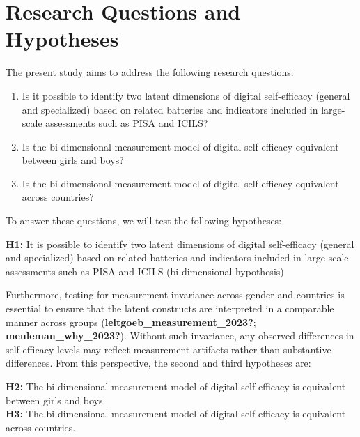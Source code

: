 \documentclass[
  letterpaper,
  DIV=11,
  numbers=noendperiod]{scrartcl}
\providecommand{\tightlist}{%
  \setlength{\itemsep}{0pt}\setlength{\parskip}{0pt}}\usepackage{longtable,booktabs,array}
\begin{document}
\section{Research Questions and
Hypotheses}\label{research-questions-and-hypotheses}

The present study aims to address the following research questions:

\begin{enumerate}
\def\labelenumi{\arabic{enumi}.}
\tightlist
\item
  Is it possible to identify two latent dimensions of digital
  self-efficacy (general and specialized) based on related batteries and
  indicators included in large-scale assessments such as PISA and ICILS?
\item
  Is the bi-dimensional measurement model of digital self-efficacy
  equivalent between girls and boys?
\item
  Is the bi-dimensional measurement model of digital self-efficacy
  equivalent across countries?
\end{enumerate}

To answer these questions, we will test the following hypotheses:

\textbf{H1:} It is possible to identify two latent dimensions of digital
self-efficacy (general and specialized) based on related batteries and
indicators included in large-scale assessments such as PISA and ICILS
(bi-dimensional hypothesis)

Furthermore, testing for measurement invariance across gender and
countries is essential to ensure that the latent constructs are
interpreted in a comparable manner across groups
(\textbf{leitgoeb\_measurement\_2023?}; \textbf{meuleman\_why\_2023?}).
Without such invariance, any observed differences in self-efficacy
levels may reflect measurement artifacts rather than substantive
differences. From this perspective, the second and third hypotheses are:

\textbf{H2:} The bi-dimensional measurement model of digital
self-efficacy is equivalent between girls and boys.\\
\textbf{H3:} The bi-dimensional measurement model of digital
self-efficacy is equivalent across countries.
\end{document}

